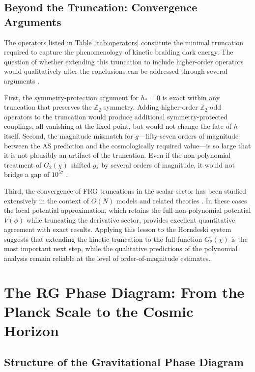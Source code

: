 \documentclass[12pt,a4paper]{article}
\begin{document}
\subsection{Beyond the Truncation: Convergence Arguments}

The operators listed in Table~\ref{tab:operators} constitute the minimal
truncation required to capture the phenomenology of kinetic braiding dark energy.
The question of whether extending this truncation to include higher-order operators
would qualitatively alter the conclusions can be addressed through several
arguments \cite{Berges2002,Dupuis2021,Pawlowski2007}.

First, the symmetry-protection argument for $h_* = 0$ is exact within any
truncation that preserves the $\mathbb{Z}_2$ symmetry. Adding higher-order
$\mathbb{Z}_2$-odd operators to the truncation would produce additional
symmetry-protected couplings, all vanishing at the fixed point, but would not
change the fate of $h$ itself. Second, the magnitude mismatch for $g$---fifty-seven
orders of magnitude between the AS prediction and the cosmologically required
value---is so large that it is not plausibly an artifact of the truncation.
Even if the non-polynomial treatment of $G_2(\chi)$ shifted $g_*$ by several
orders of magnitude, it would not bridge a gap of $10^{57}$ \cite{EichhornLinoWagner2023}.

Third, the convergence of FRG truncations in the scalar sector has been studied
extensively in the context of $O(N)$ models and related theories \cite{Berges2002,
Stanley1971,Goldenfeld1992}. In these cases the local potential approximation,
which retains the full non-polynomial potential $V(\phi)$ while truncating the
derivative sector, provides excellent quantitative agreement with exact results.
Applying this lesson to the Horndeski system suggests that extending the kinetic
truncation to the full function $G_2(\chi)$ is the most important next step,
while the qualitative predictions of the polynomial analysis remain reliable
at the level of order-of-magnitude estimates.

\section{The RG Phase Diagram: From the Planck Scale to the Cosmic Horizon}

\subsection{Structure of the Gravitational Phase Diagram}
\end{document}
